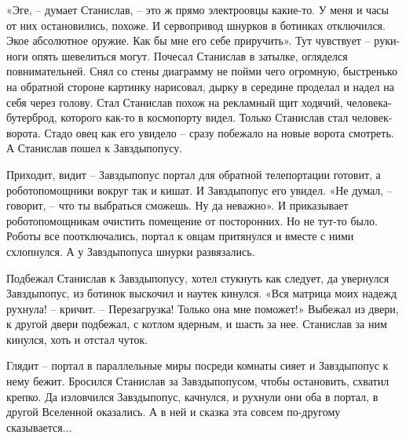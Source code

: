 \documentclass[ebook,oneside,final,openright]{memoir}
\begin{document}
\par
«Эге, – думает Станислав, – это ж прямо электроовцы какие-то. У меня и часы от них остановились, похоже. И сервопривод шнурков в ботинках отключился. Экое абсолютное оружие. Как бы мне его себе приручить». Тут чувствует – руки-ноги опять шевелиться могут. Почесал Станислав в затылке, огляделся повнимательней. Снял со стены диаграмму не пойми чего огромную, быстренько на обратной стороне картинку нарисовал, дырку в середине проделал и надел на себя через голову. Стал Станислав похож на рекламный щит ходячий, человека-бутерброд, которого как-то в космопорту видел. Только Станислав стал человек-ворота. Стадо овец как его увидело – сразу побежало на новые ворота смотреть. А Станислав пошел к Завздыпопусу.\par
\par
Приходит, видит – Завздыпопус портал для обратной телепортации готовит, а роботопомощники вокруг так и кишат. И Завздыпопус его увидел. «Не думал, – говорит, – что ты выбраться сможешь. Ну да неважно». И приказывает роботопомощникам очистить помещение от посторонних. Но не тут-то было. Роботы все поотключались, портал к овцам притянулся и вместе с ними схлопнулся. А у Завздыпопуса шнурки развязались.\par
\par
Подбежал Станислав к Завздыпопусу, хотел стукнуть как следует, да увернулся Завздыпопус, из ботинок выскочил и наутек кинулся. «Вся матрица моих надежд рухнула! – кричит. – Перезагрузка! Только она мне поможет!» Выбежал из двери, к другой двери подбежал, с котлом ядерным, и шасть за нее. Станислав за ним кинулся, хоть и отстал чуток.\par
\par
Глядит – портал в параллельные миры посреди комнаты сияет и Завздыпопус к нему бежит. Бросился Станислав за Завздыпопусом, чтобы остановить, схватил крепко. Да изловчился Завздыпопус, качнулся, и рухнули они оба в портал, в другой Вселенной оказались. А в ней и сказка эта совсем по-другому сказывается...\par
\end{document}
